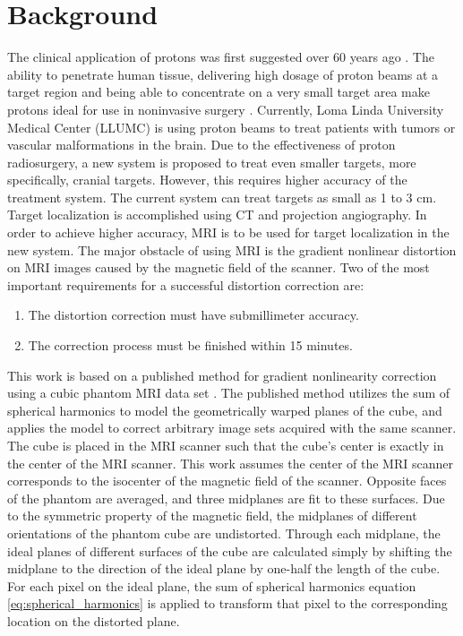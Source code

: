 \documentclass{sbthesis}
\begin{document}
\section{Background}

The clinical application of protons was first suggested over 60 years ago \cite{Wil46}.
The ability to penetrate human tissue, delivering high dosage of proton beams at a target
region and being able to concentrate on a very small target area make protons ideal for use in noninvasive surgery \cite{Wil46}. Currently, Loma Linda University
Medical Center (LLUMC) is using proton beams to treat patients with tumors or
vascular malformations in the brain.
Due to the effectiveness of proton radiosurgery, a new system is proposed to treat
even smaller targets, more specifically, cranial targets.  However, this requires higher
accuracy of the treatment system. The current system can treat targets as small as 1 to 3 cm.  Target localization is accomplished using CT and projection angiography.
In order to achieve higher accuracy, MRI is to be used for target localization in the new
system. The major obstacle of using MRI is the gradient nonlinear
distortion on MRI images caused by the magnetic field of the scanner.
Two of the most important requirements for a successful distortion correction are:

\begin{enumerate}
\item The distortion correction must have submillimeter accuracy.
\item The correction process must be finished within 15 minutes.
\end{enumerate}


This work is based on a published method for gradient nonlinearity correction using a cubic phantom MRI data set \cite{tom}. The published method utilizes the sum of spherical
harmonics to model the geometrically warped planes of the cube, and applies the model
to correct arbitrary image sets acquired with the same scanner. The cube is
placed in the MRI scanner such that the cube's center is exactly in the center of the MRI scanner.  This work assumes the center of the MRI scanner corresponds to the isocenter of the
magnetic field of the scanner. Opposite faces of the phantom are averaged, and three midplanes are fit to these surfaces.  Due to the symmetric property of the magnetic field,
the midplanes of different orientations of the phantom cube are undistorted.  Through each midplane, the ideal planes of different surfaces
of the cube are calculated simply by shifting the midplane to the direction
of the ideal plane by one-half the length of the cube. For each pixel on
the ideal plane, the sum of spherical
harmonics equation \ref{eq:spherical_harmonics} is applied to transform that pixel to the corresponding location on the distorted plane.
\end{document}
